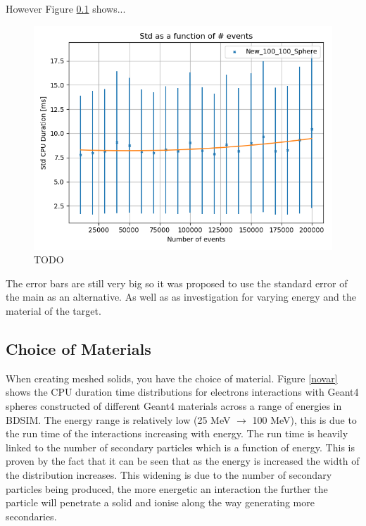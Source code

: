 \documentclass[12pt,a4paper]{article}
\begin{document}
However Figure \ref{} shows...\\
\begin{figure}[h!]
\centering
\includegraphics[scale=0.5]{Images//Error//std_N.png}
\caption[width=\columnwidth]{TODO}
\label{sphbd}
\end{figure}

The error bars are still very big so it was proposed to use the standard error of the main as an alternative. As well as as investigation for varying energy and the material of the target.

\subsection{Choice of Materials}
When creating meshed solids, you have the choice of material. Figure \ref{novar} shows the CPU duration time distributions for electrons interactions with Geant4 spheres constructed of different Geant4 materials across a range of energies in BDSIM. The energy range is relatively low (25 MeV $\rightarrow$ 100 MeV), this is due to the run time of the interactions increasing with energy. The run time is heavily linked to the number of secondary particles which is a function of energy. This is proven by the fact that it can be seen that as the energy is increased the width of the distribution increases. This widening is due to the number of secondary particles being produced, the more energetic an interaction the further the particle will penetrate a solid and ionise along the way generating more secondaries.
\end{document}
